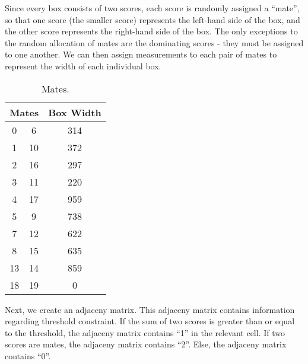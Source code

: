 \documentclass[a4paper, 11pt, twoside, onecolumn, openany]{article}
\begin{document}
Since every box consists of two scores, each score is randomly assigned a ``mate'', so that one score (the smaller score) represents the left-hand side of the box, and the other score represents the right-hand side of the box. The only exceptions to the random allocation of mates are the dominating scores - they must be assigned to one another. We can then assign measurements to each pair of mates to represent the width of each individual box. %

\begin{table}[htb]
	\centering
	\begin{tabular}{|c|c|c|}
	\hline
	\multicolumn{2}{|c|}{Mates} & Box Width \\ \hline
	0 & 6 & 314 \\ \hline
	1 & 10 & 372 \\ \hline
	2 & 16 & 297 \\ \hline
	3 & 11 & 220 \\ \hline
	4 & 17 & 959 \\ \hline
	5 & 9 & 738 \\ \hline
	7 & 12 & 622 \\ \hline
	8 & 15 & 635 \\ \hline
	13 & 14 & 859 \\ \hline
	18 & 19 & 0 \\
	\hline
	\end{tabular}
	\caption{Mates.}
\end{table}	

Next, we create an adjaceny matrix. This adjaceny matrix contains information regarding threshold constraint. If the sum of two scores is greater than or equal to the threshold, the adjaceny matrix contains ``1'' in the relevant cell. If two scores are mates, the adjaceny matrix contains ``2''. Else, the adjaceny matrix contains ``0''. %

\end{document}
